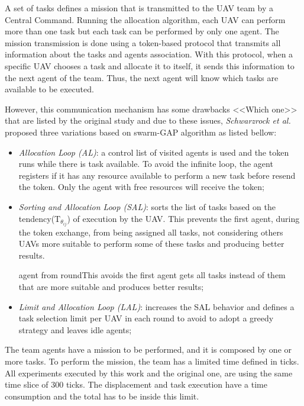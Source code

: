 A set of tasks defines a mission that is transmitted to the UAV team by a Central Command. Running the allocation algorithm, each UAV can perform more than one task but each task can be performed by only one agent. The mission transmission is done using a token-based protocol that transmits all information about the tasks and agents association. With this protocol, when a specific UAV chooses a task and allocate it to itself, it sends this information to the next agent of the team. Thus, the next agent will know which tasks are available to be executed.

However, this communication mechanism has some drawbacks <<Which one>> that are listed by the original study \cite{MAS07} and due to these issues, \textit{Schwarzrock et al.}\cite{MAS07} proposed three variations based on swarm-GAP algorithm  as listed bellow:

\begin{itemize}
   \item \textit{Allocation Loop (AL)}: a control list of visited agents is used and the token runs while there is task available. To avoid the infinite loop, the agent registers if it has any resource available to perform a new task before resend the token. Only the agent with free resources will receive the token;
   \item \textit{Sorting and Allocation Loop (SAL)}: sorts the list of tasks based on the tendency($\textrm{T}_{\theta_{ij}}$) of execution by the UAV. This prevents the first agent, during the token exchange, from being assigned all tasks, not considering others UAVs more suitable to perform some of these tasks and producing better results. 
   
   
   agent from roundThis avoids the first agent gets all tasks instead of them that are more suitable and produces better results;
   \item \textit{Limit and Allocation Loop (LAL)}: increases the SAL behavior and defines a task selection limit per UAV in each round to avoid to adopt a greedy strategy and leaves idle agents;
\end{itemize}

The team agents have a mission to be performed, and it is composed by one or more tasks. To perform the mission, the team has a limited time defined in ticks. All experiments executed by this work and the original one, are using the same time slice of 300 ticks. The displacement and task execution have a time consumption and the total has to be inside this limit.

